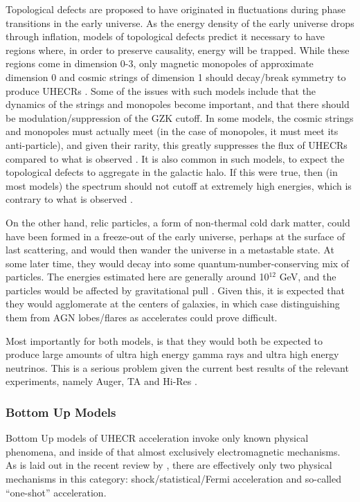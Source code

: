 Topological defects are proposed to have originated in fluctuations during phase transitions in the early universe. As the energy density of the early universe drops through inflation, models of topological defects predict it necessary to have regions where, in order to preserve causality, energy will be trapped. While these regions come in dimension 0-3, only magnetic monopoles of approximate dimension 0 and cosmic strings of dimension 1 should decay/break symmetry to produce UHECRs \cite{stanev}. Some of the issues with such models include that the dynamics of the strings and monopoles become important, and that there should be modulation/suppression of the GZK cutoff. In some models, the cosmic strings and monopoles must actually meet (in the case of monopoles, it must meet its anti-particle), and given their rarity, this greatly suppresses the flux of UHECRs compared to what is observed \cite{tds}. It is also common in such models, to expect the topological defects to aggregate in the galactic halo. If this were true, then (in most models) the spectrum should not cutoff at extremely high energies, which is contrary to what is observed \cite{swordyplot}.

On the other hand, relic particles, a form of non-thermal cold dark matter, could have been formed in a freeze-out of the early universe, perhaps at the surface of last scattering, and would then wander the universe in a metastable state. At some later time, they would decay into some quantum-number-conserving mix of particles. The energies estimated here are generally around 10$^{12}$ GeV, and the particles would be affected by gravitational pull \cite{tds,stanev}. Given this, it is expected that they would agglomerate at the centers of galaxies, in which case distinguishing them from AGN lobes/flares as accelerates could prove difficult. 

Most importantly for both models, is that they would both be expected to produce large amounts of ultra high energy gamma rays and ultra high energy neutrinos. This is a serious problem given the current best results of the relevant experiments, namely Auger, TA and Hi-Res \cite{futuregzk,foteini}. 
\subsubsection{Bottom Up Models}
\label{bottomups}
Bottom Up models of UHECR acceleration invoke only known physical phenomena, and inside of that almost exclusively electromagnetic mechanisms. As is laid out in the recent review by \textcite{stanev}, there are effectively only two physical mechanisms in this category: shock/statistical/Fermi acceleration and so-called ``one-shot'' acceleration. 

